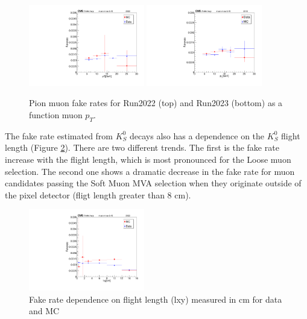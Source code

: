 \begin{figure}[!h]
  \begin{center}
    \includegraphics[width=0.45\textwidth]{figures/chapter4/fakerate/Run2022_pion-fakes.pdf}
    \includegraphics[width=0.45\textwidth]{figures/chapter4/fakerate/Run2023_pion-fakes.pdf}
    \caption{Pion muon fake rates for Run2022 (top) and
      Run2023 (bottom) as a function muon $p_{T}$.}
    \label{fig:fakerates}
  \end{center}
\end{figure}


The fake rate estimated from $K_S^0$ decays also has a dependence on the $K_S^0$ flight length (Figure \ref{fig:pion_fake_rate_fs_flight_length}). There are two different trends. The first is the fake rate increase with the flight length, which is most pronounced for the Loose muon selection. The second one shows a dramatic decrease in the fake rate for muon candidates passing the Soft Muon MVA selection when they originate outside of the pixel detector (fligt length greater than 8 cm).

\begin{figure}[!h]
  \begin{center}
    \includegraphics[width=0.45\textwidth]{figures/chapter4/fakerate/playV0-ks_kin_lxy_muidbdt45_MC_v_Data_overlay.pdf}
  \end{center}
  \caption{Fake rate dependence on flight length (lxy) measured in cm for data and MC}
  \label{fig:pion_fake_rate_fs_flight_length}
\end{figure}

